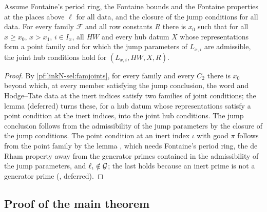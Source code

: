 \begin{proposition}\label{pf:linkN-sel:jointprop}
Assume Fontaine's period ring, the Fontaine bounds and the Fontaine properties at the places above $\ell$ for all data, and the closure of the
jump conditions for all data. For every family $\mathcal F$ and all row constants $R$ there is $x_0$ such that for all $x\ge x_0$, $x>x_1$, $i\in I_x$,
all $HW$ and every hub datum $X$ whose representations form a point family and for which the jump parameters of $L_{x,i}$ are admissible, the joint
hub conditions hold for $(L_{x,i},HW,X,R)$.
\end{proposition}

\begin{proof}
By \cref{pf:linkN-sel:famjoints}, for every family and every $C_2$ there is
$x_0$ beyond which, at every member satisfying the jump conclusion, the word and Hodge--Tate data at the inert indices satisfy two families of joint
conditions; the lemma  (deferred) turns these, for a hub datum whose
representations satisfy a point condition at the inert indices, into the joint hub conditions. The jump conclusion follows from the admissibility of
the jump parameters by the closure of the jump conditions. The point condition at an inert index $\iota$ with good $\pi$ follows from the point
family by the lemma , which needs Fontaine's period ring, the de Rham property away from
the generator primes contained in the admissibility of the jump parameters, and $\ell_\iota\notin\mathcal G$; the last holds because an inert prime
is not a generator prime (, deferred).
\end{proof}

\subsection{Proof of the main theorem}\label{sec:pf:linkN-sel:proof}

